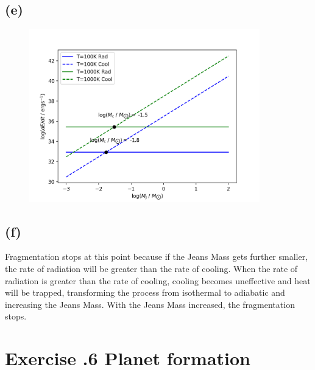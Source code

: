 \documentclass[a4paper,12pt]{article}
\begin{document}
\subsection*{(e)}
\begin{figure}[htbp]
    \centering
    \includegraphics[width=10cm]{frag.png}
\end{figure}

\subsection*{(f)}
Fragmentation stops at this point because if the Jeans Mass gets further smaller, 
the rate of radiation will be greater than the rate of cooling. When the rate of radiation 
is greater than the rate of cooling, cooling becomes uneffective and 
heat will be trapped, transforming the process from isothermal to adiabatic and 
increasing the Jeans Mass. With the Jeans Mass increased, the fragmentation stops.

\section*{\textbf{Exercise \uppercase\expandafter{}.6 Planet formation}}
\end{document}
